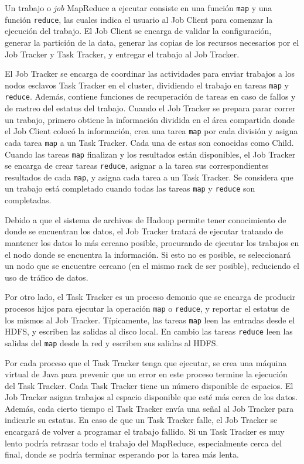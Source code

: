\documentclass[conference]{IEEEtran}
\begin{document}
Un trabajo o \textit{job} MapReduce a ejecutar consiste en una función \texttt{map} y una función \texttt{reduce}, las cuales indica el usuario al Job Client para comenzar la ejecución del trabajo.
El Job Client se encarga de validar la configuración, generar la partición de la data, generar las copias de los recursos necesarios por el Job Tracker y Task Tracker, y entregar el trabajo al Job Tracker.


El Job Tracker se encarga de coordinar las actividades para enviar trabajos a los nodos esclavos Task Tracker en el cluster, dividiendo el trabajo en tareas \texttt{map} y \texttt{reduce}.
Además, contiene funciones de recuperación de tareas en caso de fallos y de rastreo del estatus del trabajo. 
Cuando el Job Tracker se prepara parar correr un trabajo, primero obtiene la información dividida en el área compartida donde el Job Client colocó la información, crea una tarea \texttt{map} por cada división y asigna cada tarea \texttt{map} a un Task Tracker.
Cada una de estas son conocidas como Child.
Cuando las tareas \texttt{map} finalizan y los resultados están disponibles, el Job Tracker se encarga de crear tareas \texttt{reduce}, asignar a la tarea sus correspondientes resultados de cada \texttt{map}, y asigna cada tarea a un Task Tracker.
Se considera que un trabajo está completado cuando todas las tareas \texttt{map} y \texttt{reduce} son completadas.


Debido a que el sistema de archivos de Hadoop permite tener conocimiento de donde se encuentran los datos, el Job Tracker tratará de ejecutar tratando de mantener los datos lo más cercano posible, procurando de ejecutar los trabajos en el nodo donde se encuentra la información.
Si esto no es posible, se seleccionará un nodo que se encuentre cercano (en el mismo rack de ser posible), reduciendo el uso de tráfico de datos.


Por otro lado, el Task Tracker es un proceso demonio que se encarga de producir procesos hijos para ejecutar la operación \texttt{map} o \texttt{reduce}, y reportar el estatus de los mismos al Job Tracker.
Típicamente, las tareas \texttt{map} leen las entradas desde el HDFS, y escriben las salidas al disco local. 
En cambio las tareas \texttt{reduce} leen las salidas del \texttt{map} desde la red y escriben sus salidas al HDFS.



Por cada proceso que el Task Tracker tenga que ejecutar, se crea una máquina virtual de Java para prevenir que un error en este proceso termine la ejecución del Task Tracker.
Cada Task Tracker tiene un número disponible de espacios.
El Job Tracker asigna trabajos al espacio disponible que esté más cerca de los datos.
Además, cada cierto tiempo el Task Tracker envía una señal al Job Tracker para indicarle su estatus. 
En caso de que un Task Tracker falle, el Job Tracker se encargará de volver a programar el trabajo fallido.
Si un Task Tracker es muy lento podría retrasar todo el trabajo del MapReduce, especialmente cerca del final, donde se podría terminar esperando por la tarea más lenta.
\end{document}
